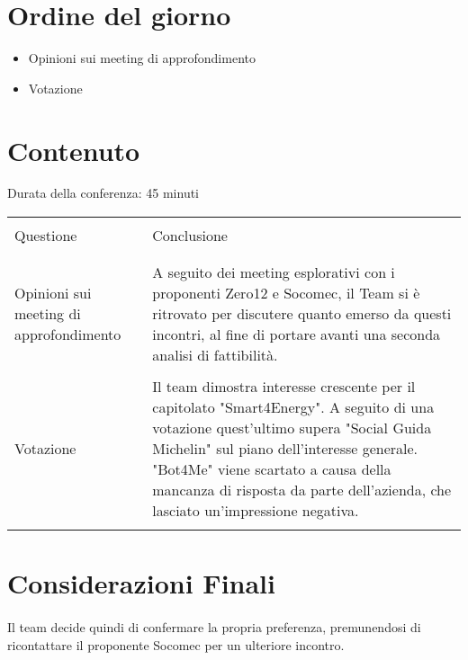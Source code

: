 \section{Ordine del giorno}
\begin{itemize}
    \item Opinioni sui meeting di approfondimento
    \item Votazione
\end{itemize}
\section{Contenuto}
Durata della conferenza: 45 minuti
\newline
\begin{longtable}{|p{7cm}|p{8cm}|}
    \hline
    & \\
    Questione & Conclusione\\
    & \\
    \hline
    & \\

    Opinioni sui meeting di approfondimento
    &
    A seguito dei meeting esplorativi con i proponenti Zero12
    e Socomec, il Team si è ritrovato per discutere quanto
    emerso da questi incontri, al fine di portare avanti
    una seconda analisi di fattibilità.\\

    & \\

    Votazione
    &
    Il team dimostra interesse crescente per
    il capitolato "Smart4Energy". A seguito di una
    votazione quest'ultimo supera
    "Social Guida Michelin" sul piano
    dell'interesse generale. "Bot4Me" viene
    scartato a causa della mancanza di risposta
    da parte dell'azienda, che lasciato
    un'impressione negativa.\\

    & \\
    
    \hline
\end{longtable}

\section{Considerazioni Finali}

\paragraph{}
Il team decide quindi di confermare la propria preferenza,
premunendosi di ricontattare il proponente Socomec per un ulteriore incontro.